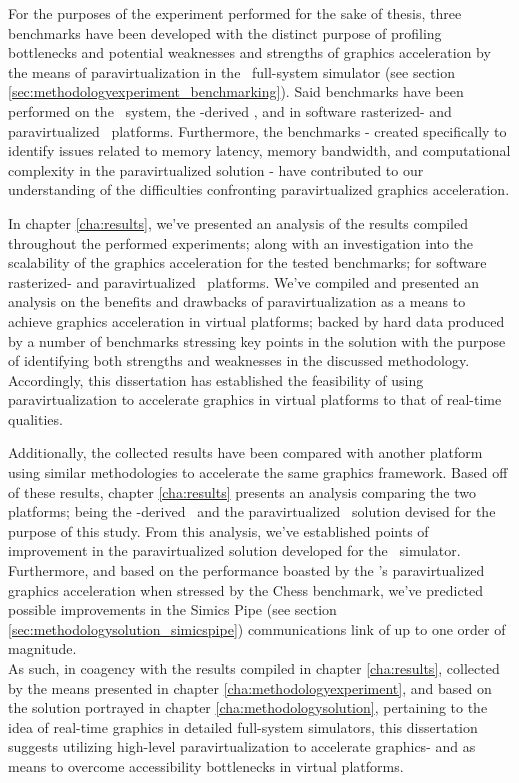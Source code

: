 For the purposes of the experiment performed for the sake of thesis, three benchmarks have been developed with the distinct purpose of profiling bottlenecks and potential weaknesses and strengths of graphics acceleration by the means of paravirtualization in the \dvttermsimics\ full-system simulator (see section \ref{sec:methodologyexperiment_benchmarking}).
Said benchmarks have been performed on the \dvttermhost\ system, the \dvttermqemu -derived \dvttermandroidemulator , and in software rasterized- and paravirtualized \dvttermsimics\ platforms.
Furthermore, the benchmarks - created specifically to identify issues related to memory latency, memory bandwidth, and computational complexity in the paravirtualized solution - have contributed to our understanding of the difficulties confronting paravirtualized graphics acceleration.

In chapter \ref{cha:results}, we've presented an analysis of the results compiled throughout the performed experiments; along with an investigation into the scalability of the graphics acceleration for the tested benchmarks; for software rasterized- and paravirtualized \dvttermsimics\ platforms.
We've compiled and presented an analysis on the benefits and drawbacks of paravirtualization as a means to achieve graphics acceleration in virtual platforms; backed by hard data produced by a number of benchmarks stressing key points in the solution with the purpose of identifying both strengths and weaknesses in the discussed methodology.
Accordingly, this dissertation has established the feasibility of using paravirtualization to accelerate graphics in virtual platforms to that of real-time qualities.

Additionally, the collected results have been compared with another platform using similar methodologies to accelerate the same graphics framework.
Based off of these results, chapter \ref{cha:results} presents an analysis comparing the two platforms; being the \dvttermqemu -derived \dvttermandroidemulator\ and the paravirtualized \dvttermsimics\ solution devised for the purpose of this study.
From this analysis, we've established points of improvement in the paravirtualized solution developed for the \dvttermsimics\ simulator.
Furthermore, and based on the performance boasted by the \dvttermandroidemulator 's paravirtualized graphics acceleration when stressed by the Chess benchmark, we've predicted possible improvements in the Simics Pipe (see section \ref{sec:methodologysolution_simicspipe}) communications link of up to one order of magnitude.\\

\noindent
As such, in coagency with the results compiled in chapter \ref{cha:results}, collected by the means presented in chapter \ref{cha:methodologyexperiment}, and based on the solution portrayed in chapter \ref{cha:methodologysolution}, pertaining to the idea of real-time graphics in detailed full-system simulators, this dissertation suggests utilizing high-level paravirtualization to accelerate graphics- and as means to overcome accessibility bottlenecks in virtual platforms.
